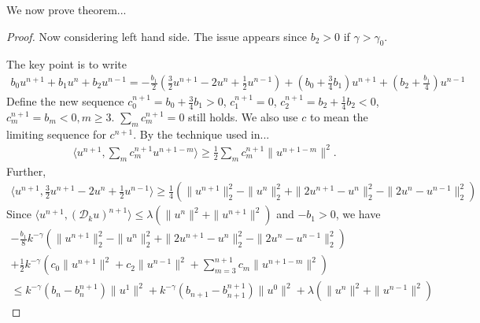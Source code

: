 \documentclass[11pt]{article} %
\begin{document}
We now prove theorem...
\begin{proof}

Now considering left hand side. The issue appears since $b_2>0$ if $\gamma>\gamma_0$.

The key point is to write 
\begin{gather*}
b_0u^{n+1}+b_1u^n+b_2u^{n-1}
=-\frac{b_1}{2}(\frac{3}{2}u^{n+1}-2u^n+\frac{1}{2}u^{n-1})
+(b_0+\frac{3}{4}b_1)u^{n+1}+(b_2+\frac{b_1}{4})u^{n-1}
\end{gather*}
Define the new sequence $c_0^{n+1}=b_0+\frac{3}{4}b_1>0$, $c_1^{n+1}=0$,
$c_2^{n+1}=b_2+\frac{1}{4}b_2<0$, $c_m^{n+1}=b_m<0, m\ge 3$. $\sum_m c_m^{n+1}=0$ still holds. We also use $c$ to mean the limiting sequence for $c^{n+1}$. By the technique used in...
\begin{gather*}
\langle u^{n+1}, \sum_m c_m^{n+1}u^{n+1-m}\rangle\ge 
\frac{1}{2}\sum_m c_m^{n+1}\|u^{n+1-m}\|^2.
\end{gather*}
Further, 
\begin{multline*}
\langle u^{n+1}, \frac{3}{2}u^{n+1}-2u^n+\frac{1}{2}u^{n-1}\rangle
\ge \frac{1}{4}(\|u^{n+1}\|_2^2-\|u^n\|_2^2+\|2u^{n+1}-u^n\|_2^2-\|2u^n-u^{n-1}\|_2^2)
\end{multline*}
Since $\langle u^{n+1}, (\mathcal{D}_k u)^{n+1}\rangle\le \lambda(\|u^n\|^2+\|u^{n+1}\|^2)$ and $-b_1>0$, we have
\begin{multline*}
-\frac{b_1}{8}k^{-\gamma}(\|u^{n+1}\|_2^2-\|u^n\|_2^2+\|2u^{n+1}-u^n\|_2^2-\|2u^n-u^{n-1}\|_2^2)\\
+\frac{1}{2}k^{-\gamma}\left(c_0\|u^{n+1}\|^2
+c_2\|u^{n-1}\|^2
+\sum_{m=3}^{n+1}c_m\|u^{n+1-m}\|^2\right)\\
\le k^{-\gamma}(b_{n}-b^{n+1}_n)\|u^1\|^2
+k^{-\gamma}(b_{n+1}-b_{n+1}^{n+1})\|u^0\|^2+\lambda(\|u^n\|^2+\|u^{n-1}\|^2)
\end{multline*}


\end{proof}
\end{document}
